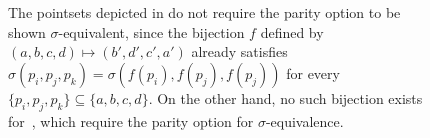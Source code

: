 \begin{figure}
\begin{subfigure}{0.45\linewidth}
        \caption{}\label{fig:equiv-d}
    \end{subfigure}
  \caption{The pointsets depicted in  do not require the parity option to be shown $\sigma$-equivalent, since the bijection $f$ defined by $(a,b,c,d) \mapsto (b', d', c', a')$ already satisfies $\sigma(p_i, p_j, p_k) = \sigma(f(p_i), f(p_j), f(p_j))$ for every $\{p_i, p_j, p_k\} \subseteq \{a,b,c,d\}.$ On the other hand, no such bijection exists for~,  which require the parity option for $\sigma$-equivalence. }\label{fig:sigma-equiv}
  \end{figure}
